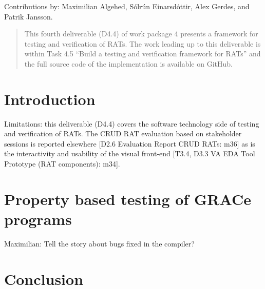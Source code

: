 \documentclass{article}
\begin{document}
Contributions by: Maximilian Algehed, Sólrún Einarsdóttir, Alex
Gerdes, and Patrik Jansson.

\begin{abstract}

This fourth deliverable (D4.4) of work package 4 presents a framework for
testing and verification of RATs.
%
The work leading up to this deliverable is within Task 4.5 ``Build a
testing and verification framework for RATs'' and the full source code
of the implementation is available on GitHub.


\end{abstract}

\vfill

\setcounter{tocdepth}{2}
\tableofcontents

\vfill


\newpage

\section{Introduction}


Limitations: this deliverable (D4.4) covers the software technology
side of testing and verification of RATs.
%
The CRUD RAT evaluation based on stakeholder sessions is reported
elsewhere [D2.6 Evaluation Report CRUD RATs: m36] as is the
interactivity and usability of the visual front-end [T3.4, D3.3 VA EDA
  Tool Prototype (RAT components): m34].


\section{}

\section{}




\section{Property based testing of GRACe programs}

Maximilian: Tell the story about bugs fixed in the compiler?

\section{Conclusion}
\end{document}
